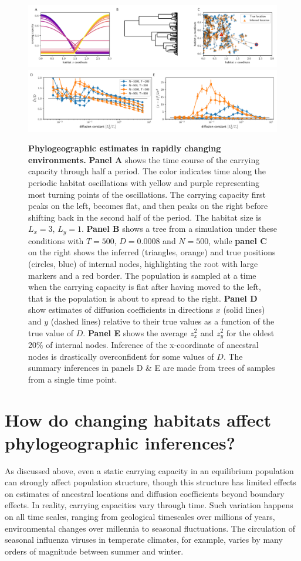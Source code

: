 \documentclass[aps,rmp, twocolumn]{revtex4}
\begin{document}
\begin{figure}
    \includegraphics[width=\textwidth]{figures/seasaw_example}
    \includegraphics[width=\textwidth]{figures/seasaw}
    \caption{\label{fig:seasaw} {\bf Phylogeographic estimates in rapidly changing environments.} {\bf Panel A} shows the time course of the carrying capacity through half a period. The color indicates time along the periodic habitat oscillations with yellow and purple representing most turning points of the oscillations. The carrying capacity first peaks on the left, becomes flat, and then peaks on the right before shifting back in the second half of the period. The habitat size is $L_x=3$, $L_y=1$.
    {\bf Panel B} shows a tree from a simulation under these conditions with $T=500$, $D=0.0008$ and $N=500$, while {\bf panel C} on the right shows the inferred (triangles, orange) and true positions (circles, blue) of internal nodes, highlighting the root with large markers and a red border.
    The population is sampled at a time when the carrying capacity is flat after having moved to the left, that is the population is about to spread to the right.
    {\bf Panel D} show estimates of diffusion coefficients in directions $x$ (solid lines) and $y$ (dashed lines) relative to their true values as a function of the true value of $D$. {\bf Panel E} shows the average $z_x^2$ and $z_y^2$ for the oldest 20\% of internal nodes. Inference of the x-coordinate of ancestral nodes is drastically overconfident for some values of $D$. The summary inferences in panels D \& E are made from trees of samples from a single time point.  }
\end{figure}

\section*{How do changing habitats affect phylogeographic inferences?}
As discussed above, even a static carrying capacity in an equilibrium population can strongly affect population structure, though this structure has limited effects on estimates of ancestral locations and diffusion coefficients beyond boundary effects.
In reality, carrying capacities vary through time.
Such variation happens on all time scales, ranging from geological timescales over millions of years, environmental changes over millennia to seasonal fluctuations.
The circulation of seasonal influenza viruses in temperate climates, for example, varies by many orders of magnitude between summer and winter.
\end{document}
